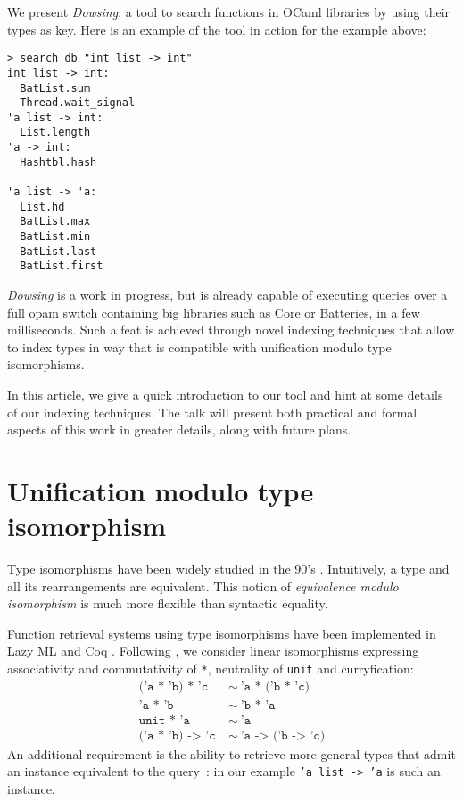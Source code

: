 \documentclass [a4paper,11pt]{scrartcl}
\newcommand{\dowsing}{\textit{Dowsing}\xspace}
\begin{document}
We present \dowsing, a tool to search functions in OCaml libraries by
using their types as key.
Here is an example of the tool in action for the example above:

\begin{lstlisting}[multicols=2]
> search db "int list -> int"
int list -> int:
  BatList.sum
  Thread.wait_signal
'a list -> int:
  List.length
'a -> int:
  Hashtbl.hash
  
'a list -> 'a:
  List.hd
  BatList.max
  BatList.min
  BatList.last
  BatList.first
\end{lstlisting}

\dowsing is a work in progress, but is already capable of
executing queries over a full opam switch
containing big libraries such as Core or Batteries, in a few milliseconds.
Such a feat is achieved through novel indexing techniques that allow
to index types in way that is compatible with unification modulo type
isomorphisms.

In this article, we give a quick introduction to our tool and hint at some
details of our indexing techniques. The talk will present both practical
and formal aspects of this work in greater details, along with
future plans.



\section{Unification modulo type isomorphism}

Type isomorphisms have been widely studied in the 90's \cite {dicosmo}. Intuitively, a type and all its rearrangements are equivalent. This notion of \textit {equivalence modulo isomorphism} is much more flexible than syntactic equality. 

Function retrieval systems using type isomorphisms have been implemented in Lazy ML \cite {rittri} and Coq \cite {delahaye}. Following \cite {rittri}, we consider linear isomorphisms expressing associativity and commutativity of \texttt {*}, neutrality of \texttt {unit} and curryfication:
\begin {align*}
  \texttt {('a * 'b) * 'c} &\ \sim\ \texttt {'a * ('b * 'c)} \\
  \texttt {'a * 'b} &\ \sim\ \texttt {'b * 'a} \\
  \texttt {unit * 'a} &\ \sim\ \texttt {'a} \\
  \texttt {('a * 'b) -> 'c} &\ \sim\ \texttt {'a -> ('b -> 'c)}
\end {align*}
An additional requirement is the ability to retrieve more general types that admit an instance equivalent to the query~: in our example \texttt {'a list -> 'a} is such an instance. 
\end{document}
